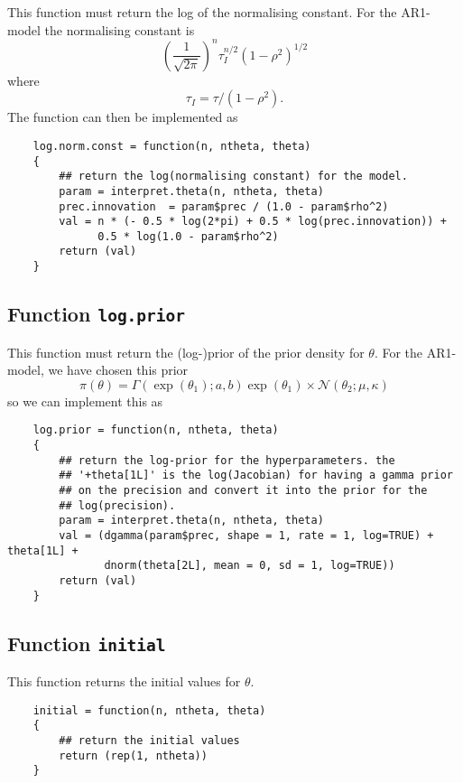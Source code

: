 \documentclass[a4paper,11pt]{article}
\begin{document}
This function must return the log of the normalising constant. For the 
 AR1-model the normalising constant is 
\begin{displaymath}
    \left(\frac{1}{\sqrt{2\pi}}\right)^{n}
    \tau_{I}^{n/2} (1-\rho^{2})^{1/2}
\end{displaymath}
where
\begin{displaymath}
    \tau_{I} = \tau/(1-\rho^{2}).
\end{displaymath}
The function can then be implemented as
\begin{verbatim}
    log.norm.const = function(n, ntheta, theta)
    {
        ## return the log(normalising constant) for the model.
        param = interpret.theta(n, ntheta, theta)
        prec.innovation  = param$prec / (1.0 - param$rho^2)
        val = n * (- 0.5 * log(2*pi) + 0.5 * log(prec.innovation)) +
              0.5 * log(1.0 - param$rho^2)
        return (val)
    }
\end{verbatim}

\subsection*{Function \texttt{log.prior}}

This function must return the (log-)prior of the prior density for
$\theta$. For the AR1-model, we have chosen this prior
\begin{displaymath}
    \pi(\theta) = \Gamma(\exp(\theta_1); a,b) \exp(\theta_1) \times
    {\mathcal N}(\theta_{2}; \mu, \kappa)
\end{displaymath}
so we can implement this as
\begin{verbatim}
    log.prior = function(n, ntheta, theta)
    {
        ## return the log-prior for the hyperparameters. the
        ## '+theta[1L]' is the log(Jacobian) for having a gamma prior
        ## on the precision and convert it into the prior for the
        ## log(precision).
        param = interpret.theta(n, ntheta, theta)
        val = (dgamma(param$prec, shape = 1, rate = 1, log=TRUE) + theta[1L] + 
               dnorm(theta[2L], mean = 0, sd = 1, log=TRUE))
        return (val)
    }
\end{verbatim}

\subsection*{Function \texttt{initial}}

This function returns the initial values for $\theta$.
\begin{verbatim}
    initial = function(n, ntheta, theta)
    {
        ## return the initial values
        return (rep(1, ntheta))
    }
\end{verbatim}
\end{document}
